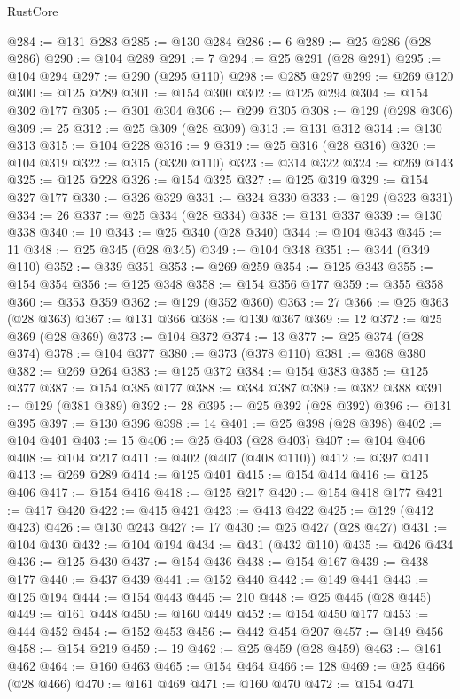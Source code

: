 \begin{lexlean}{RustCore}
\begin{coremodule}
@284 := @131 @283
@285 := @130 @284
@286 := 6
@289 := @25 @286 (@28 @286)
@290 := @104 @289
@291 := 7
@294 := @25 @291 (@28 @291)
@295 := @104 @294
@297 := @290 (@295 @110)
@298 := @285 @297
@299 := @269 @120
@300 := @125 @289
@301 := @154 @300
@302 := @125 @294
@304 := @154 @302 @177
@305 := @301 @304
@306 := @299 @305
@308 := @129 (@298 @306)
@309 := 25
@312 := @25 @309 (@28 @309)
@313 := @131 @312
@314 := @130 @313
@315 := @104 @228
@316 := 9
@319 := @25 @316 (@28 @316)
@320 := @104 @319
@322 := @315 (@320 @110)
@323 := @314 @322
@324 := @269 @143
@325 := @125 @228
@326 := @154 @325
@327 := @125 @319
@329 := @154 @327 @177
@330 := @326 @329
@331 := @324 @330
@333 := @129 (@323 @331)
@334 := 26
@337 := @25 @334 (@28 @334)
@338 := @131 @337
@339 := @130 @338
@340 := 10
@343 := @25 @340 (@28 @340)
@344 := @104 @343
@345 := 11
@348 := @25 @345 (@28 @345)
@349 := @104 @348
@351 := @344 (@349 @110)
@352 := @339 @351
@353 := @269 @259
@354 := @125 @343
@355 := @154 @354
@356 := @125 @348
@358 := @154 @356 @177
@359 := @355 @358
@360 := @353 @359
@362 := @129 (@352 @360)
@363 := 27
@366 := @25 @363 (@28 @363)
@367 := @131 @366
@368 := @130 @367
@369 := 12
@372 := @25 @369 (@28 @369)
@373 := @104 @372
@374 := 13
@377 := @25 @374 (@28 @374)
@378 := @104 @377
@380 := @373 (@378 @110)
@381 := @368 @380
@382 := @269 @264
@383 := @125 @372
@384 := @154 @383
@385 := @125 @377
@387 := @154 @385 @177
@388 := @384 @387
@389 := @382 @388
@391 := @129 (@381 @389)
@392 := 28
@395 := @25 @392 (@28 @392)
@396 := @131 @395
@397 := @130 @396
@398 := 14
@401 := @25 @398 (@28 @398)
@402 := @104 @401
@403 := 15
@406 := @25 @403 (@28 @403)
@407 := @104 @406
@408 := @104 @217
@411 := @402 (@407 (@408 @110))
@412 := @397 @411
@413 := @269 @289
@414 := @125 @401
@415 := @154 @414
@416 := @125 @406
@417 := @154 @416
@418 := @125 @217
@420 := @154 @418 @177
@421 := @417 @420
@422 := @415 @421
@423 := @413 @422
@425 := @129 (@412 @423)
@426 := @130 @243
@427 := 17
@430 := @25 @427 (@28 @427)
@431 := @104 @430
@432 := @104 @194
@434 := @431 (@432 @110)
@435 := @426 @434
@436 := @125 @430
@437 := @154 @436
@438 := @154 @167
@439 := @438 @177
@440 := @437 @439
@441 := @152 @440
@442 := @149 @441
@443 := @125 @194
@444 := @154 @443
@445 := 210
@448 := @25 @445 (@28 @445)
@449 := @161 @448
@450 := @160 @449
@452 := @154 @450 @177
@453 := @444 @452
@454 := @152 @453
@456 := @442 @454 @207
@457 := @149 @456
@458 := @154 @219
@459 := 19
@462 := @25 @459 (@28 @459)
@463 := @161 @462
@464 := @160 @463
@465 := @154 @464
@466 := 128
@469 := @25 @466 (@28 @466)
@470 := @161 @469
@471 := @160 @470
@472 := @154 @471

\end{coremodule}
\end{lexlean}
